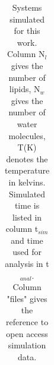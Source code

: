 \documentclass[journal=jacsat,manuscript=article,layout=singlecolumn]{achemso}
\begin{document}
\begin{table}[]
\begin{small}
\begin{tabular}{cccccccccc}
\end{tabular}
\end{small}
\caption{Systems simulated for this work. Column N$_l$ gives the number of lipids, N$_w$ gives the number of water molecules, T(K) denotes the temperature in kelvins. Simulated time is listed in column t$_{sim}$ and time used for analysis in t$_{anal}$. Column "files" gives the reference to open access simulation data.}
\end{table}


\begin{acknowledgement}


\end{acknowledgement}

\begin{suppinfo}
\end{suppinfo}


\end{document}
